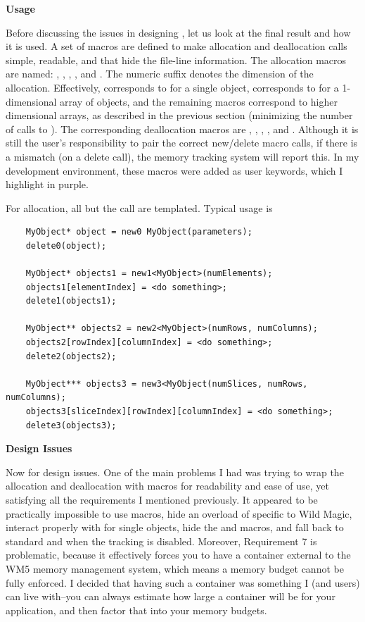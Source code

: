 \documentclass{article}
\begin{document}
\vspace*{0.1in}
{\bf Usage}

Before discussing the issues in designing , let us look at
the final result and how it is used.  A set of macros are defined to
make allocation and deallocation calls simple, readable, and that hide
the file-line information.  The allocation macros are named:  ,
, , , and .  The numeric
suffix denotes the dimension of the allocation.  Effectively, 
corresponds to  for a single object,  corresponds
to  for a 1-dimensional array of objects, and the remaining
macros correspond to higher dimensional arrays, as described in the
previous section (minimizing the number of calls to ).  The
corresponding deallocation macros are , ,
, , and .  Although it is
still the user's responsibility to pair the correct new/delete macro
calls, if there is a mismatch (on a delete call), the memory tracking
system will report this.  In my development environment, these macros
were added as user keywords, which I highlight in purple.

For allocation, all but the  call are templated.  Typical usage is
\begin{verbatim}
    MyObject* object = new0 MyObject(parameters);
    delete0(object);
    
    MyObject* objects1 = new1<MyObject>(numElements);
    objects1[elementIndex] = <do something>;
    delete1(objects1);
    
    MyObject** objects2 = new2<MyObject>(numRows, numColumns);
    objects2[rowIndex][columnIndex] = <do something>;
    delete2(objects2);
    
    MyObject*** objects3 = new3<MyObject(numSlices, numRows, numColumns);
    objects3[sliceIndex][rowIndex][columnIndex] = <do something>;
    delete3(objects3);
\end{verbatim}

\vspace*{0.1in}
{\bf Design Issues}

Now for design issues.  One of the main problems I had was trying to wrap
the allocation and deallocation with macros for readability and ease of
use, yet satisfying all the requirements I mentioned previously.  It
appeared to be practically impossible to use macros, hide an overload
of  specific to Wild Magic, interact properly with
 for single objects, hide the  and
 macros, and fall back to standard  and
 when the tracking is disabled.  Moreover, Requirement 7
is problematic, because it effectively forces you to have a container
external to the WM5 memory management system, which means a memory budget
cannot be fully enforced.  I decided that having such a container was
something I (and users) can live with--you can always estimate how large
a container will be for your application, and then factor that into your
memory budgets.
\end{document}
